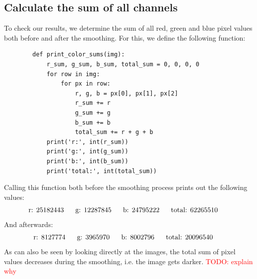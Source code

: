 \newpage
\subsection{Calculate the sum of all channels}
    To check our results, we determine the sum of all red, green 
    and blue pixel values both before and after the smoothing.
    For this, we define the following function:
    \begin{lstlisting}
        def print_color_sums(img):
            r_sum, g_sum, b_sum, total_sum = 0, 0, 0, 0
            for row in img:
                for px in row:
                    r, g, b = px[0], px[1], px[2]
                    r_sum += r
                    g_sum += g
                    b_sum += b
                    total_sum += r + g + b
            print('r:', int(r_sum))
            print('g:', int(g_sum))
            print('b:', int(b_sum))
            print('total:', int(total_sum))\end{lstlisting}
    Calling this function both before the smoothing process prints out
    the following values: \\
    $$
        \textnormal{r: 25182443} \ \ \ \ \
        \textnormal{g: 12287845} \ \ \ \ \
        \textnormal{b: 24795222} \ \ \ \ \
        \textnormal{total: 62265510} \ \ \ \ \
    $$
    And afterwards:
    $$
        \textnormal{r: 8127774} \ \ \ \ \
        \textnormal{g: 3965970} \ \ \ \ \
        \textnormal{b: 8002796} \ \ \ \ \
        \textnormal{total: 20096540} \ \ \ \ \
    $$
    As can also be seen by looking directly at the images, the total sum of 
    pixel values decreases during the smoothing, i.e. the image gets darker.
    \textcolor{red}{TODO: explain why}
